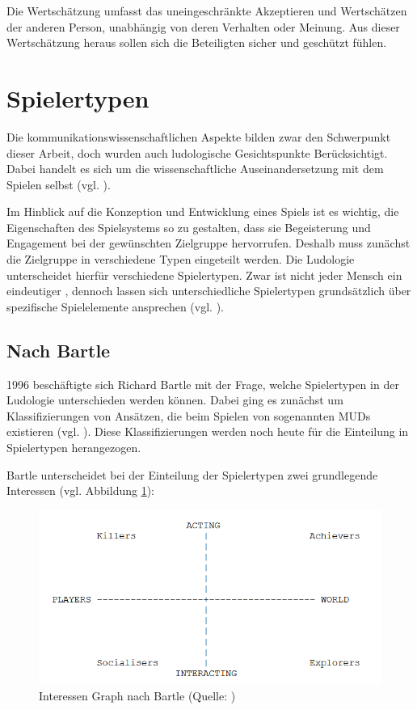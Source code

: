 Die Wertschätzung umfasst das uneingeschränkte Akzeptieren und Wertschätzen der anderen Person, unabhängig von deren Verhalten oder Meinung. Aus dieser Wertschätzung heraus sollen sich die Beteiligten sicher und geschützt fühlen.

\section{Spielertypen}
Die kommunikationswissenschaftlichen Aspekte bilden zwar den Schwerpunkt dieser Arbeit, doch wurden auch ludologische Gesichtspunkte Berücksichtigt. Dabei handelt es sich um die wissenschaftliche Auseinandersetzung mit dem Spielen selbst (vgl. \citealp{institut_fur_ludologie_spielforschung_nodate}). 

Im Hinblick auf die Konzeption und Entwicklung eines Spiels ist es wichtig, die Eigenschaften des Spielsystems so zu gestalten, dass sie Begeisterung und Engagement bei der gewünschten Zielgruppe hervorrufen. Deshalb muss zunächst die Zielgruppe in verschiedene Typen eingeteilt werden. Die Ludologie unterscheidet hierfür verschiedene Spielertypen. Zwar ist nicht jeder Mensch ein eindeutiger , dennoch lassen sich unterschiedliche Spielertypen grundsätzlich über spezifische Spielelemente ansprechen (vgl. \citealp{institut_fur_ludologie_spielertypen_nodate}).

\subsection{Nach Bartle}
1996 beschäftigte sich Richard Bartle mit der Frage, welche Spielertypen in der Ludologie unterschieden werden können. Dabei ging es zunächst um Klassifizierungen von Ansätzen, die beim Spielen von sogenannten \ac{MUD}s existieren (vgl. \cite{bartle_hearts_1996}). Diese Klassifizierungen werden noch heute für die Einteilung in Spielertypen herangezogen.

Bartle unterscheidet bei der Einteilung der Spielertypen zwei grundlegende Interessen (vgl. Abbildung \ref{fig:bartle-muds}):

\begin{figure}[ht]
\centering
\includegraphics[width=1\linewidth]{content/pictures/basic_interests.PNG}
\caption{Interessen Graph nach Bartle (Quelle: \citealp{bartle_hearts_1996})}
\label{fig:bartle-muds}
\end{figure}

